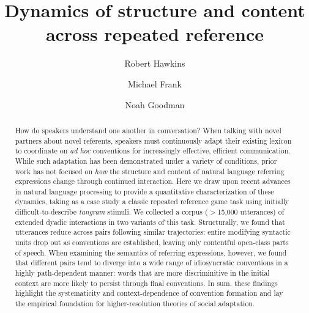\documentclass[alpha-refs]{wiley-article}
\title{Dynamics of structure and content across repeated reference}
\author[1]{Robert Hawkins}
\author[1]{Michael Frank}
\author[1,2]{Noah Goodman}
\affil[1]{Department of Psychology, Stanford University}
\affil[2]{Department of Computer Science, Stanford University}
\begin{document}
\maketitle





\begin{abstract}
How do speakers understand one another in conversation? 
When talking with novel partners about novel referents, speakers must continuously adapt their existing lexicon to coordinate on \emph{ad hoc} conventions for increasingly effective, efficient communication.
While such adaptation has been demonstrated under a variety of conditions, prior work has not focused on \emph{how} the structure and content of natural language referring expressions change through continued interaction.
Here we draw upon recent advances in natural language processing to provide a quantitative characterization of these dynamics, taking as a case study a classic repeated reference game task using initially difficult-to-describe \emph{tangram} stimuli.
We collected a corpus ($>$15,000 utterances) of extended dyadic interactions in two variants of this task.
Structurally, we found that utterances reduce across pairs following similar trajectories: entire modifying syntactic units drop out as conventions are established, leaving only contentful open-class parts of speech.
When examining the semantics of referring expressions, however, we found that different pairs tend to diverge into a wide range of idiosyncratic conventions in a highly path-dependent manner:  
words that are more discriminitive in the initial context are more likely to persist through final conventions.
In sum, these findings highlight the systematicity and context-dependence of convention formation and lay the empirical foundation for higher-resolution theories of social adaptation.

\end{abstract}
\end{document}
